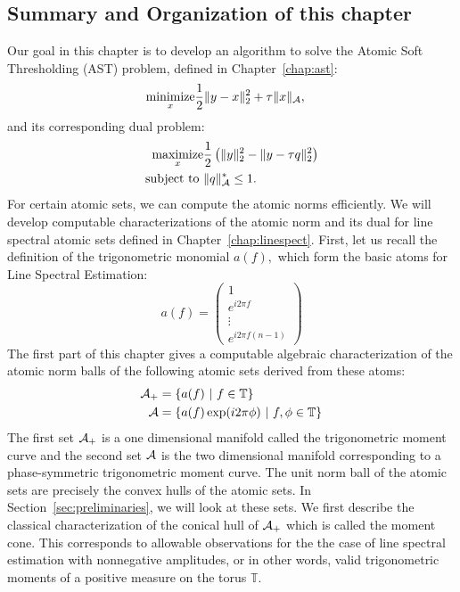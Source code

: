 \subsection*{Summary and Organization of this chapter} %
\label{sub:main_results}
Our goal in this chapter is to develop an algorithm to solve the Atomic Soft
Thresholding (AST) problem, defined in Chapter~\ref{chap:ast}:
\begin{align}
\begin{split}
\mathop{\operatorname{minimize}}_x & \frac{1}{2}\lVert y-x\rVert_2^2 + \tau \lVert x\rVert_{\mathcal{A}},
\end{split}	
\end{align}
and its corresponding dual problem:
\begin{align}
\begin{split}
\mathop{\operatorname{maximize}}_x & \frac{1}{2}\left(\lVert y\rVert_2^2 - \lVert y-\tau q\rVert_2^2\right)\\
\text{subject to } & \lVert q\rVert_{\mathcal{A}}^* \leq 1. 
\end{split}
\end{align}
For certain atomic sets, we can compute the atomic norms efficiently. We will
develop computable characterizations of the atomic norm and its dual for line
spectral atomic sets defined in Chapter~\ref{chap:linespect}. First, let us
recall the definition of the trigonometric monomial $a(f),$ which form the basic
atoms for Line Spectral Estimation:
{\footnotesize
\[
a(f) = \begin{pmatrix}
	1\\
	e^{i 2\pi f}\\
	\vdots\\
	e^{i2\pi f (n-1)}
\end{pmatrix}
\]
}
The first part of this chapter gives a computable algebraic characterization of the atomic norm balls of the following atomic sets derived from these atoms:
\begin{align}
\mathcal{A}_+ &= \left\{ a(f) ~\middle|~ f \in \mathbb{T} \right\}\\
\mathcal{A}   &= \left\{ a(f) \exp(i 2\pi \phi) ~\middle|~ f, \phi \in \mathbb{T} \right\}
\end{align}
The first set $\mathcal{A}_+$ is a one dimensional manifold called the trigonometric
moment curve and the second set $\mathcal{A}$ is the two dimensional manifold
corresponding to a phase-symmetric trigonometric moment curve. The unit norm
ball of the atomic sets are precisely the convex hulls of the atomic sets. In
Section~\ref{sec:preliminaries}, we will look at these sets. We first describe
the classical characterization of the conical hull of $\mathcal{A}_+$ which is called the moment cone. This corresponds to allowable observations for the the case of line
spectral estimation with nonnegative amplitudes, or in other words, valid
trigonometric moments of a positive measure on the torus $\mathbb{T}$.

